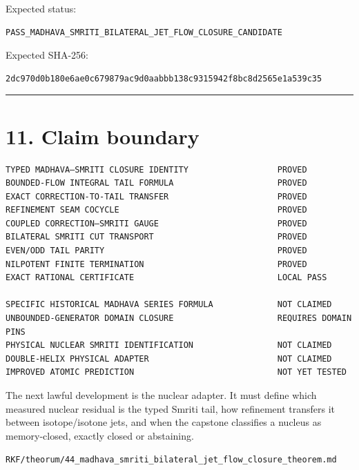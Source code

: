 Expected status:

\begin{verbatim}
PASS_MADHAVA_SMRITI_BILATERAL_JET_FLOW_CLOSURE_CANDIDATE
\end{verbatim}

Expected SHA-256:

\begin{verbatim}
2dc970d0b180e6ae0c679879ac9d0aabbb138c9315942f8bc8d2565e1a539c35
\end{verbatim}

\begin{center}\rule{0.5\linewidth}{0.5pt}\end{center}

\hypertarget{claim-boundary}{%
\section{11. Claim boundary}\label{claim-boundary}}

\begin{verbatim}
TYPED MADHAVA–SMRITI CLOSURE IDENTITY                  PROVED
BOUNDED-FLOW INTEGRAL TAIL FORMULA                     PROVED
EXACT CORRECTION-TO-TAIL TRANSFER                      PROVED
REFINEMENT SEAM COCYCLE                                PROVED
COUPLED CORRECTION–SMRITI GAUGE                        PROVED
BILATERAL SMRITI CUT TRANSPORT                         PROVED
EVEN/ODD TAIL PARITY                                   PROVED
NILPOTENT FINITE TERMINATION                           PROVED
EXACT RATIONAL CERTIFICATE                             LOCAL PASS

SPECIFIC HISTORICAL MADHAVA SERIES FORMULA             NOT CLAIMED
UNBOUNDED-GENERATOR DOMAIN CLOSURE                     REQUIRES DOMAIN PINS
PHYSICAL NUCLEAR SMRITI IDENTIFICATION                 NOT CLAIMED
DOUBLE-HELIX PHYSICAL ADAPTER                          NOT CLAIMED
IMPROVED ATOMIC PREDICTION                             NOT YET TESTED
\end{verbatim}

The next lawful development is the nuclear adapter. It must define which
measured nuclear residual is the typed Smriti tail, how refinement transfers it
between isotope/isotone jets, and when the capstone classifies a nucleus as
memory-closed, exactly closed or abstaining.

\begin{flushright}\small\texttt{RKF/theorum/44\_madhava\_smriti\_bilateral\_jet\_flow\_closure\_theorem.md}\end{flushright}
